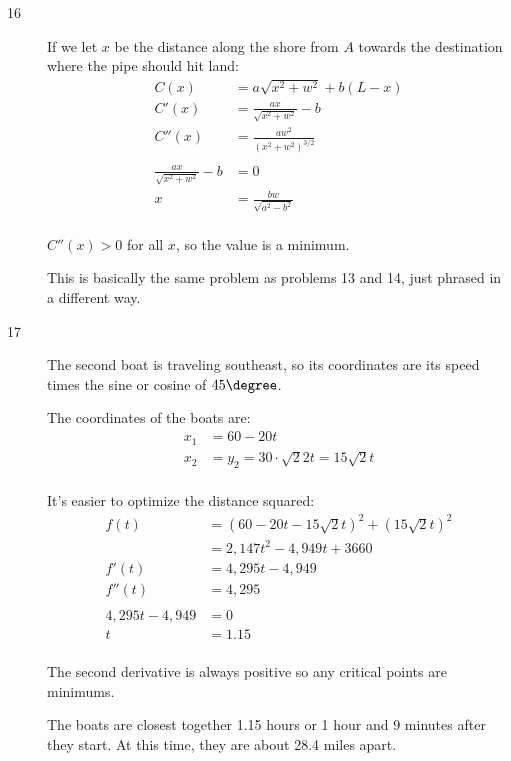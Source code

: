 \documentclass[fleqn]{exam}
\begin{document}
\begin{description}
\item[16]
If we let $x$ be the distance along the shore from $A$ towards the destination where the pipe should hit land:
\begin{align*}
  C(x)   &= a \sqrt{x^2 + w^2} + b(L - x) \\
  C'(x)  &= \frac{ax}{\sqrt{x^2 + w^2}} - b \\
  C''(x) &= \frac{aw^2}{(x^2 + w^2)^{3/2}} \\
\\
  \frac{ax}{\sqrt{x^2 + w^2}} - b &= 0 \\
   x &= \frac{bw}{\sqrt{a^2 - b^2}} \\
\end{align*}

$C''(x) > 0$ for all $x$, so the value is a minimum.

This is basically the same problem as problems 13 and 14, just phrased in a different way.

\pagebreak

\item[17]

The second boat is traveling southeast, so its coordinates are its speed times the sine or cosine of $45 \degree$.

The coordinates of the boats are:
\begin{align*}
  x_1 &= 60 - 20t \\
  x_2 &= y_2 = 30 \cdot \sqrt{2}{2} t = 15 \sqrt{2} t \\ 
\end{align*}

It's easier to optimize the distance squared:
\begin{align*}
  f(t) &= (60 - 20t - 15 \sqrt{2} t)^2 + (15 \sqrt{2} t)^2 \\
       &= 2,147 t^2 - 4,949t + 3660 \\
  f'(t) &= 4,295t - 4,949 \\
  f''(t) &= 4,295 \\
\\
  4,295t - 4,949 &= 0 \\
  t &= 1.15 \\
\end{align*}

The second derivative is always positive so any critical points are minimums. 

The boats are closest together 1.15 hours or 1 hour and 9 minutes after they start.  At this time, they are about 28.4
miles apart.


\end{description}
\end{document}
